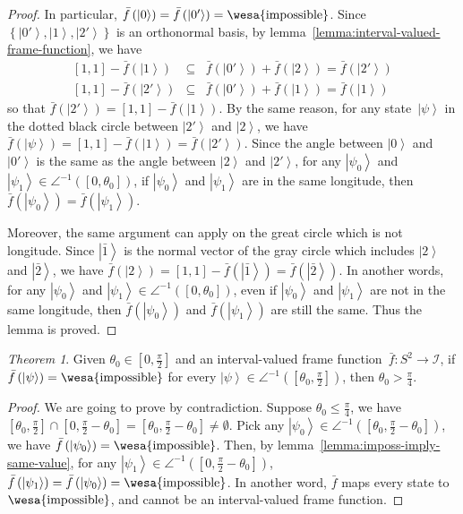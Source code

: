 \documentclass{article}
\theoremstyle{remark}
\newtheorem{thm}{Theorem}
\newcommand{\imposs}{{\mbox{\wesa{impossible}}}}
\newcommand{\ket}[1]{{\left\vert{#1}\right\rangle}}
\begin{document}
\begin{proof}
In particular, $\bar{f}\left(\ket{0}\right)=\bar{f}\left(\ket{0'}\right)=\imposs$.
Since $\left\{ \ket{0'},\ket{1},\ket{2'}\right\} $ is an orthonormal
basis, by lemma~\ref{lemma:interval-valued-frame-function}, we have
\begin{eqnarray*}
\left[1,1\right]-\bar{f}\left(\ket{1}\right) & \subseteq & \bar{f}\left(\ket{0'}\right)+\bar{f}\left(\ket{2}\right)=\bar{f}\left(\ket{2'}\right)\\
\left[1,1\right]-\bar{f}\left(\ket{2'}\right) & \subseteq & \bar{f}\left(\ket{0'}\right)+\bar{f}\left(\ket{1}\right)=\bar{f}\left(\ket{1}\right)
\end{eqnarray*}
so that $\bar{f}\left(\ket{2'}\right)=\left[1,1\right]-\bar{f}\left(\ket{1}\right)$.
By the same reason, for any state~$\ket{\psi}$ in the dotted black
circle between $\ket{2'}$ and $\ket{2}$, we have $\bar{f}\left(\ket{\psi}\right)=\left[1,1\right]-\bar{f}\left(\ket{1}\right)=\bar{f}\left(\ket{2'}\right)$.
Since the angle between $\ket{0}$ and $\ket{0'}$ is the same as
the angle between $\ket{2}$ and $\ket{2'}$, for any $\ket{\psi_{0}}$
and $\ket{\psi_{1}}\in\angle^{-1}\left(\left[0,\theta_{0}\right]\right)$,
if $\ket{\psi_{0}}$ and $\ket{\psi_{1}}$ are in the same longitude,
then $\bar{f}\left(\ket{\psi_{0}}\right)=\bar{f}\left(\ket{\psi_{1}}\right)$.

Moreover, the same argument can apply on the great circle which is
not longitude. Since $\ket{\bar{1}}$ is the normal vector of the
gray circle which includes $\ket{2}$ and $\ket{\bar{2}}$, we have
$\bar{f}\left(\ket{2}\right)=\left[1,1\right]-\bar{f}\left(\ket{\bar{1}}\right)=\bar{f}\left(\ket{\bar{2}}\right)$.
In another words, for any $\ket{\psi_{0}}$ and $\ket{\psi_{1}}\in\angle^{-1}\left(\left[0,\theta_{0}\right]\right)$,
even if $\ket{\psi_{0}}$ and $\ket{\psi_{1}}$ are not in the same
longitude, then $\bar{f}\left(\ket{\psi_{0}}\right)$ and $\bar{f}\left(\ket{\psi_{1}}\right)$
are still the same. Thus the lemma is proved.
\end{proof}
\begin{thm}\label{thm:pi-div-4}Given $\theta_{0}\in\left[0,\frac{\pi}{2}\right]$
and an interval-valued frame function~$\bar{f}:S^{2}\rightarrow\mathscr{I}$,
if $\bar{f}\left(\ket{\psi}\right)=\imposs$ for every $\ket{\psi}\in\angle^{-1}\left(\left[\theta_{0},\frac{\pi}{2}\right]\right)$,
then $\theta_{0}>\frac{\pi}{4}$.\end{thm}
\begin{proof}
We are going to prove by contradiction. Suppose $\theta_{0}\le\frac{\pi}{4}$,
we have $\left[\theta_{0},\frac{\pi}{2}\right]\cap\left[0,\frac{\pi}{2}-\theta_{0}\right]=\left[\theta_{0},\frac{\pi}{2}-\theta_{0}\right]\ne\emptyset$.
Pick any $\ket{\psi_{0}}\in\angle^{-1}\left(\left[\theta_{0},\frac{\pi}{2}-\theta_{0}\right]\right)$,
we have $\bar{f}\left(\ket{\psi_{0}}\right)=\imposs$. Then, by lemma~\ref{lemma:imposs-imply-same-value},
for any $\ket{\psi_{1}}\in\angle^{-1}\left(\left[0,\frac{\pi}{2}-\theta_{0}\right]\right)$,
$\bar{f}\left(\ket{\psi_{1}}\right)=\bar{f}\left(\ket{\psi_{0}}\right)=\imposs$.
In another word, $\bar{f}$ maps every state to $\imposs$, and cannot
be an interval-valued frame function.
\end{proof}
\end{document}
